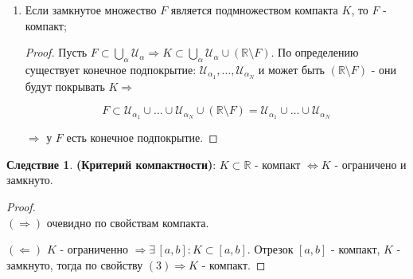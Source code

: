 \documentclass[12pt]{article}
\theoremstyle{definition}
\newtheorem{corollary}{Следствие}
\begin{document}
\begin{enumerate}[label={(\arabic*)}]
\begin{proof}
		Если взять объединение всех таких множеств, то получим всю прямую без точки $a$: $\bigcup\limits_n \mathcal{U}_n = \mathbb{R} \setminus \{a\}$. Но это содержит компакт $K \colon K \subset \mathbb{R} \setminus \{a\} \Rightarrow$ объединение лучей (откр. множеств) содержит $K$.
		
		По определению $\exists$ конечное подпокрытие $\mathcal{U}_{n_1}, \dotsc ,\mathcal{U}_{n_N} \Rightarrow$ возьмем $M = \max\limits_{1\leq s \leq N} \{n_s\}$.\\
		Тогда $\mathbb{R}\setminus [a - \frac{1}{M}, a+ \frac{1}{M}] \supset K \Rightarrow$ взяли из этого набора лучей тот, который наиболее близко подошел к точке $a \Rightarrow (a - \frac{1}{M}, a+ \frac{1}{M}) \subset \mathbb{R} \setminus K$, то есть $\mathbb{R} \setminus K$ - открыто.		
	\end{proof}
	\item Если замкнутое множество $F$ является подмножеством компакта $K$, то $F$ - компакт;
	\begin{proof}
		Пусть $F \subset \bigcup\limits_\alpha \mathcal{U}_\alpha \Rightarrow K \subset \bigcup\limits_\alpha \mathcal{U}_\alpha \cup (\mathbb{R} \setminus F)$. По определению существует конечное подпокрытие: $\mathcal{U}_{\alpha_1}, \dotsc, \mathcal{U}_{\alpha_N}$ и может быть $(\mathbb{R} \setminus F)$ 	- они будут покрывать $K \Rightarrow$ 
		
		$$F \subset \mathcal{U}_{\alpha_1} \cup \dotsc \cup \mathcal{U}_{\alpha_N} \cup (\mathbb{R} \setminus F) = \mathcal{U}_{\alpha_1} \cup \dotsc \cup \mathcal{U}_{\alpha_N}$$ 
		
		$\Rightarrow$ у $F$ есть конечное подпокрытие.
	\end{proof}
\end{enumerate}

\begin{corollary}\textbf{(Критерий компактности)}:
	$K \subset \mathbb{R}$ - компакт $\Leftrightarrow K$ - ограничено и замкнуто.
\end{corollary}

\begin{proof}\hfill\\
	$(\Rightarrow)$ очевидно по свойствам компакта.
	
	$(\Leftarrow)$ $K$ - ограниченно $\Rightarrow \exists \, [a,b] \colon K \subset [a,b]$. Отрезок $[a,b]$ - компакт, $K$ - замкнуто, тогда по свойству $(3) \Rightarrow K$ - компакт.
\end{proof}
\end{document}
